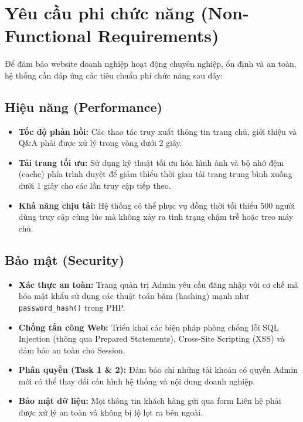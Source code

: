 \section{Yêu cầu phi chức năng (Non-Functional Requirements)}

Để đảm bảo website doanh nghiệp hoạt động chuyên nghiệp, ổn định và an toàn, hệ thống cần đáp ứng các tiêu chuẩn phi chức năng sau đây:

\subsection{Hiệu năng (Performance)}
\begin{itemize}
    \item \textbf{Tốc độ phản hồi:} Các thao tác truy xuất thông tin trang chủ, giới thiệu và Q\&A phải được xử lý trong vòng dưới 2 giây.
    \item \textbf{Tải trang tối ưu:} Sử dụng kỹ thuật tối ưu hóa hình ảnh và bộ nhớ đệm (cache) phía trình duyệt để giảm thiểu thời gian tải trang trung bình xuống dưới 1 giây cho các lần truy cập tiếp theo.
    \item \textbf{Khả năng chịu tải:} Hệ thống có thể phục vụ đồng thời tối thiểu 500 người dùng truy cập cùng lúc mà không xảy ra tình trạng chậm trễ hoặc treo máy chủ.
\end{itemize}

\subsection{Bảo mật (Security)}
\begin{itemize}
    \item \textbf{Xác thực an toàn:} Trang quản trị Admin yêu cầu đăng nhập với cơ chế mã hóa mật khẩu sử dụng các thuật toán băm (hashing) mạnh như \texttt{password\_hash()} trong PHP.
    \item \textbf{Chống tấn công Web:} Triển khai các biện pháp phòng chống lỗi SQL Injection (thông qua Prepared Statements), Cross-Site Scripting (XSS) và đảm bảo an toàn cho Session.
    \item \textbf{Phân quyền (Task 1 \& 2):} Đảm bảo chỉ những tài khoản có quyền Admin mới có thể thay đổi cấu hình hệ thống và nội dung doanh nghiệp.
    \item \textbf{Bảo mật dữ liệu:} Mọi thông tin khách hàng gửi qua form Liên hệ phải được xử lý an toàn và không bị lộ lọt ra bên ngoài.
\end{itemize}

